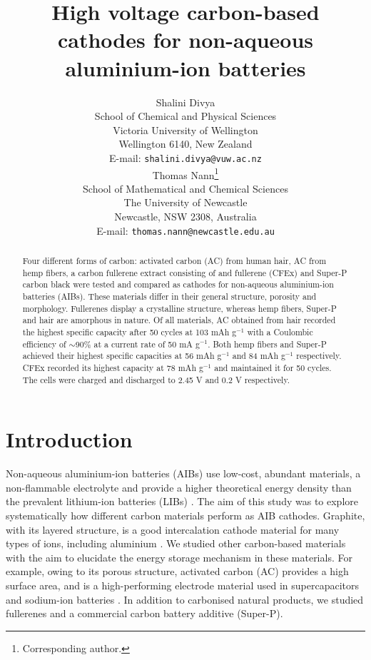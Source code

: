 \documentclass{article}
\title{High voltage carbon-based cathodes for non-aqueous aluminium-ion batteries}
\author{
  Shalini Divya\\
  School of Chemical and Physical Sciences\\
  Victoria University of Wellington\\
  Wellington 6140, New Zealand\\
  E-mail: \texttt{shalini.divya@vuw.ac.nz}\\
   \And
  Thomas Nann\thanks{Corresponding author.}\\
  School of Mathematical and Chemical Sciences\\
  The University of Newcastle\\
  Newcastle, NSW 2308, Australia\\
  E-mail: \texttt{thomas.nann@newcastle.edu.au}\\
}
\begin{document}
\maketitle
\begin{abstract}
 Four different forms of carbon: activated carbon (AC) from human hair, AC from hemp fibers, a carbon fullerene extract consisting of  and  fullerene (CFEx) and Super-P carbon black were tested and compared as cathodes for non-aqueous aluminium-ion batteries (AIBs). These materials differ in their general structure, porosity and morphology. Fullerenes display a crystalline structure, whereas hemp fibers, Super-P and hair are amorphous in nature. Of all materials, AC obtained from hair recorded the highest specific capacity after 50 cycles at 103 mAh g$^{-1}$ with a Coulombic efficiency of $\sim$90\% at a current rate of 50 mA g$^{-1}$. Both hemp fibers and Super-P achieved their highest specific capacities at 56 mAh g$^{-1}$ and 84 mAh g$^{-1}$ respectively. CFEx recorded its highest capacity at 78 mAh g$^{-1}$ and maintained it for 50 cycles. The cells were charged and discharged to 2.45 V and 0.2 V respectively. 
 \end{abstract}
 

\section{Introduction}
Non-aqueous aluminium-ion batteries (AIBs) use low-cost, abundant materials, a non-flammable electrolyte and provide a higher theoretical energy density than the prevalent lithium-ion batteries (LIBs) \cite{lin_ultrafast_2015,paranthaman_transformational_2010,wang_advanced_2017, ambroz_trends_2017}. The aim of this study was to explore systematically how different carbon materials perform as AIB cathodes. Graphite, with its layered structure, is a good intercalation cathode material for many types of ions, including aluminium \cite{ji_recent_2011, yoo_large_2008, lian_large_2010}. We studied other carbon-based materials with the aim to elucidate the energy storage mechanism in these materials. For example, owing to its porous structure, activated carbon (AC) provides a high surface area, and is a high-performing electrode material used in supercapacitors and sodium-ion batteries \cite{eliad_ion_2001, zhu_carbon-based_2011}. In addition to carbonised natural products, we studied fullerenes and a commercial carbon battery additive (Super-P).
\end{document}
